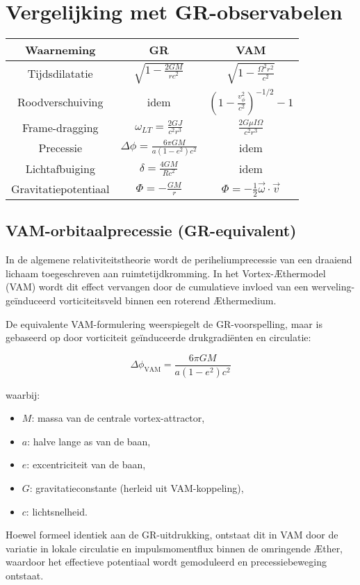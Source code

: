 \section{Vergelijking met GR-observabelen}
\begin{center}
    \begin{tabular}{|c|c|c|}
        \hline
        \textbf{Waarneming} & GR & VAM \\
        \hline
        Tijdsdilatatie & $\sqrt{1 - \frac{2GM}{rc^2}}$ & $\sqrt{1 - \frac{\Omega^2 r^2}{c^2}}$ \\
        Roodverschuiving & idem & $\left(1 - \frac{v_\phi^2}{c^2} \right)^{-1/2} - 1$ \\
        Frame-dragging & $\omega_{LT} = \frac{2GJ}{c^2 r^3}$ & $\frac{2G \mu I \Omega}{c^2 r^3}$ \\
        Precessie & $\Delta\phi = \frac{6\pi GM}{a(1 - e^2)c^2}$ & idem \\
        Lichtafbuiging & $\delta = \frac{4GM}{Rc^2}$ & idem \\
        Gravitatiepotentiaal & $\Phi = -\frac{GM}{r}$ & $\Phi = -\frac{1}{2} \vec{\omega} \cdot \vec{v}$ \\
        \hline
    \end{tabular}
\end{center}



\subsection*{VAM-orbitaalprecessie (GR-equivalent)}

    In de algemene relativiteitstheorie wordt de periheliumprecessie van een draaiend lichaam toegeschreven aan ruimtetijdkromming. In het Vortex-Æthermodel (VAM) wordt dit effect vervangen door de cumulatieve invloed van een werveling-geïnduceerd vorticiteitsveld binnen een roterend Æthermedium.

    De equivalente VAM-formulering weerspiegelt de GR-voorspelling, maar is gebaseerd op door vorticiteit geïnduceerde drukgradiënten en circulatie:

    \begin{equation}
        \Delta\phi_{\text{VAM}} =
        \frac{6\pi G M}{a(1 - e^2) c^2}
    \end{equation}

    waarbij:
    \begin{itemize}
        \item \( M \): massa van de centrale vortex-attractor,
        \item \( a \): halve lange as van de baan,
        \item \( e \): excentriciteit van de baan,
        \item \( G \): gravitatieconstante (herleid uit VAM-koppeling),
        \item \( c \): lichtsnelheid.
    \end{itemize}
    Hoewel formeel identiek aan de GR-uitdrukking, ontstaat dit in VAM door de variatie in lokale circulatie en impulsmomentflux binnen de omringende Æther, waardoor het effectieve potentiaal wordt gemoduleerd en precessiebeweging ontstaat.

